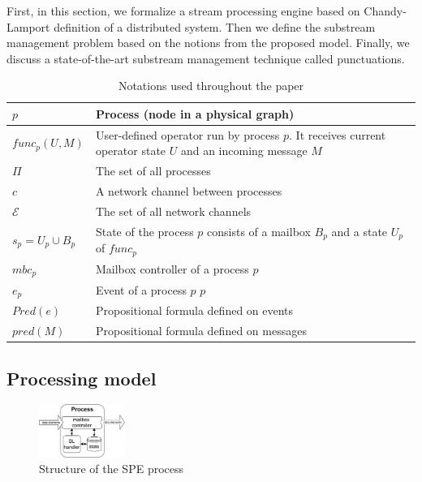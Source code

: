 \label{fs-acker-preliminaries}

First, in this section, we formalize a stream processing engine based on Chandy-Lamport definition of a distributed system. Then we define the substream management problem based on the notions from the proposed model. Finally, we discuss a state-of-the-art substream management technique called punctuations.

\begin{table}[!b]
    \caption{Notations used throughout the paper}
    \begin{tabular}{l|p{5cm}}
        \hline
        $p$ & Process (node in a physical graph) \\ 
        \hline
        $func_p(U, M)$ & User-defined operator run by process $p$. It receives current operator state $U$ and an incoming message $M$ \\ 
        \hline
        $\Pi$ & The set of all processes  \\
        \hline
        $c$ & A network channel between processes  \\
        \hline
        $\mathcal{E}$ & The set of all network channels  \\
        \hline
        $s_p = U_p \cup B_p$ & State of the process $p$ consists of a mailbox $B_p$ and a state $U_p$ of $func_p$ \\
        \hline
        $mbc_{p}$ & Mailbox controller of a process $p$ \\
        \hline
        $e_{p}$ & Event of a process $p$ $p$ \\
        \hline
        $Pred(e)$ & Propositional formula defined on events \\
        \hline
        $pred(M)$ & Propositional formula defined on messages\\
    \end{tabular}
    \label{notations}
\end{table}

\subsection{Processing model}

\begin{figure}[htbp]
  \centering
  \includegraphics[width=0.25\textwidth]{pics/process-scheme.pdf}
  \caption{Structure of the SPE process}
  \label{fig:spe_process}
\end{figure}

